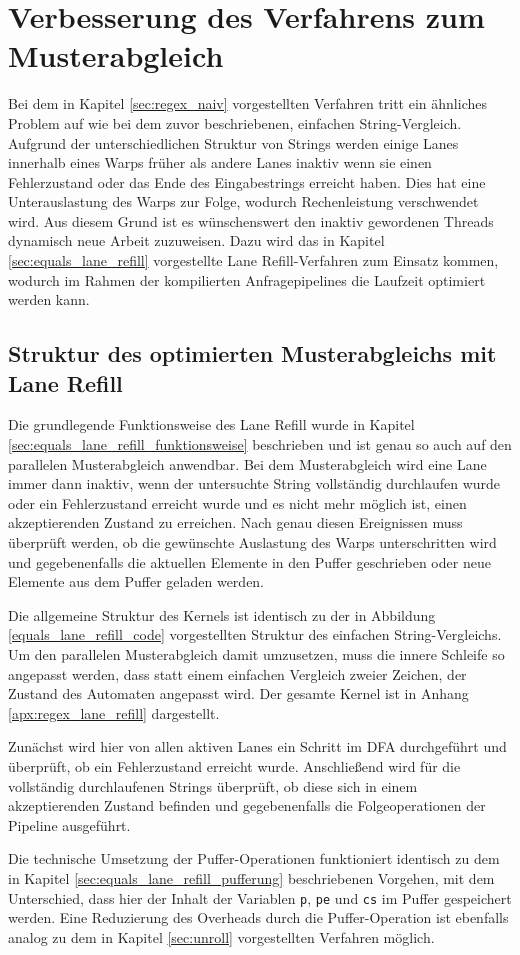 \chapter{Verbesserung des Verfahrens zum Musterabgleich}

Bei dem in Kapitel \ref{sec:regex_naiv} vorgestellten Verfahren tritt ein ähnliches Problem auf wie bei dem zuvor beschriebenen, einfachen String-Vergleich.
Aufgrund der unterschiedlichen Struktur von Strings werden einige Lanes innerhalb eines Warps früher als andere Lanes inaktiv wenn sie einen Fehlerzustand oder das Ende des Eingabestrings erreicht haben.
Dies hat eine Unterauslastung des Warps zur Folge, wodurch Rechenleistung verschwendet wird.
Aus diesem Grund ist es wünschenswert den inaktiv gewordenen Threads dynamisch neue Arbeit zuzuweisen.
Dazu wird das in Kapitel \ref{sec:equals_lane_refill} vorgestellte Lane Refill-Verfahren zum Einsatz kommen, wodurch im Rahmen der kompilierten Anfragepipelines die Laufzeit optimiert werden kann.


\section{Struktur des optimierten Musterabgleichs mit Lane Refill}

Die grundlegende Funktionsweise des Lane Refill wurde in Kapitel \ref{sec:equals_lane_refill_funktionsweise} beschrieben und ist genau so auch auf den parallelen Musterabgleich anwendbar.
Bei dem Musterabgleich wird eine Lane immer dann inaktiv, wenn der untersuchte String vollständig durchlaufen wurde oder ein Fehlerzustand erreicht wurde und es nicht mehr möglich ist, einen akzeptierenden Zustand zu erreichen.
Nach genau diesen Ereignissen muss überprüft werden, ob die gewünschte Auslastung des Warps unterschritten wird und gegebenenfalls die aktuellen Elemente in den Puffer geschrieben oder neue Elemente aus dem Puffer geladen werden.

Die allgemeine Struktur des Kernels ist identisch zu der in Abbildung \ref{equals_lane_refill_code} vorgestellten Struktur des einfachen String-Vergleichs.
Um den parallelen Musterabgleich damit umzusetzen, muss die innere Schleife so angepasst werden, dass statt einem einfachen Vergleich zweier Zeichen, der Zustand des Automaten angepasst wird.
Der gesamte Kernel ist in Anhang \ref{apx:regex_lane_refill} dargestellt.

Zunächst wird hier von allen aktiven Lanes ein Schritt im DFA durchgeführt und überprüft, ob ein Fehlerzustand erreicht wurde.
Anschließend wird für die vollständig durchlaufenen Strings überprüft, ob diese sich in einem akzeptierenden Zustand befinden und gegebenenfalls die Folgeoperationen der Pipeline ausgeführt.

Die technische Umsetzung der Puffer-Operationen funktioniert identisch zu dem in Kapitel \ref{sec:equals_lane_refill_pufferung} beschriebenen Vorgehen, mit dem Unterschied, dass hier der Inhalt der Variablen \texttt{p}, \texttt{pe} und \texttt{cs} im Puffer gespeichert werden.
Eine Reduzierung des Overheads durch die Puffer-Operation ist ebenfalls analog zu dem in Kapitel \ref{sec:unroll} vorgestellten Verfahren möglich.